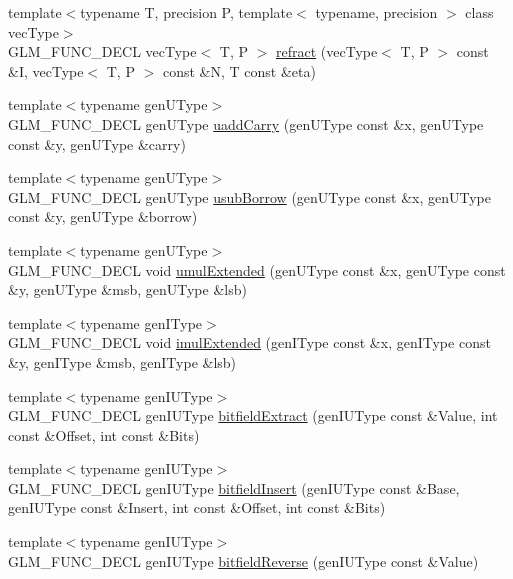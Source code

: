 \begin{CompactItemize}
\item 
{\footnotesize template$<$typename T, precision P, template$<$ typename, precision $>$ class vecType$>$ }\\GLM\_\-FUNC\_\-DECL vecType$<$ T, P $>$ \hyperlink{group__core__func__geometric_g2020e01c134ebe03c1690306ff93af53}{refract} (vecType$<$ T, P $>$ const \&I, vecType$<$ T, P $>$ const \&N, T const \&eta)
\item 
{\footnotesize template$<$typename genUType$>$ }\\GLM\_\-FUNC\_\-DECL genUType \hyperlink{group__core__func__integer_gcb5031847f80c2e28151a687e57bd4b8}{uaddCarry} (genUType const \&x, genUType const \&y, genUType \&carry)
\item 
{\footnotesize template$<$typename genUType$>$ }\\GLM\_\-FUNC\_\-DECL genUType \hyperlink{group__core__func__integer_ge13e6c290847ba577bdd0b82b2527ce2}{usubBorrow} (genUType const \&x, genUType const \&y, genUType \&borrow)
\item 
{\footnotesize template$<$typename genUType$>$ }\\GLM\_\-FUNC\_\-DECL void \hyperlink{group__core__func__integer_g74e6492619a6a79d3130b56f7b6eb6a8}{umulExtended} (genUType const \&x, genUType const \&y, genUType \&msb, genUType \&lsb)
\item 
{\footnotesize template$<$typename genIType$>$ }\\GLM\_\-FUNC\_\-DECL void \hyperlink{group__core__func__integer_g2f837b25b019b4dfacc4091a3a45c4b9}{imulExtended} (genIType const \&x, genIType const \&y, genIType \&msb, genIType \&lsb)
\item 
{\footnotesize template$<$typename genIUType$>$ }\\GLM\_\-FUNC\_\-DECL genIUType \hyperlink{group__core__func__integer_gcd29b1963983f03da4de38aaffac6dbd}{bitfieldExtract} (genIUType const \&Value, int const \&Offset, int const \&Bits)
\item 
{\footnotesize template$<$typename genIUType$>$ }\\GLM\_\-FUNC\_\-DECL genIUType \hyperlink{group__core__func__integer_g33b112990d40ef4c8bf91591dc7d9cd9}{bitfieldInsert} (genIUType const \&Base, genIUType const \&Insert, int const \&Offset, int const \&Bits)
\item 
{\footnotesize template$<$typename genIUType$>$ }\\GLM\_\-FUNC\_\-DECL genIUType \hyperlink{group__core__func__integer_ge55354ee3125593fc17f4cff052e6a10}{bitfieldReverse} (genIUType const \&Value)

\end{CompactItemize}
